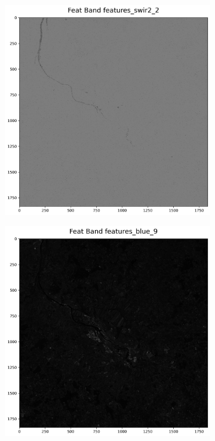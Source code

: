 \documentclass[12pt,a4paper, english]{article}
\begin{document}
  \begin{figure}[!htbp]
      \centering
      \begin{subfigure}[b]{0.3\textwidth}
        \includegraphics[width=\textwidth]{img/Features_swir1.png}
      \end{subfigure}
      \begin{subfigure}[b]{0.3\textwidth}
        \includegraphics[width=\textwidth]{img/Features_blue3.png}

\end{subfigure}
\end{figure}
\end{document}
